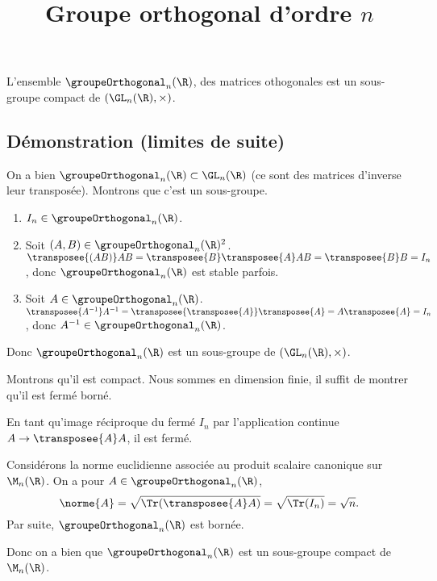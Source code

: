 \documentclass[fontsize=12pt,twoside=false,parskip=half]{scrartcl}
\title{Groupe orthogonal d’ordre $n$}
\date{}
\author{}
\begin{document}
\maketitle
   \begin{Theoreme}
      L’ensemble $\groupeOrthogonal_n(\R)$, des matrices othogonales est un sous-groupe compact de $(\GL_n(\R), \times)$.
   \end{Theoreme}
   \subsection{Démonstration (limites de suite)}
      On a bien $\groupeOrthogonal_n(\R) \subset \GL_n(\R)$ (ce sont des matrices d’inverse leur transposée). Montrons que
      c’est un sous-groupe.
      \begin{enumerate}
         \item $I_n \in \groupeOrthogonal_n(\R)$.
         \item Soit $(A, B) \in \groupeOrthogonal_n(\R)^2$. $\transposee{(AB)}AB = \transposee{B}\transposee{A}AB = \transposee{B}B = I_n$, donc
               $\groupeOrthogonal_n(\R)$ est stable parfois.
         \item Soit $A \in \groupeOrthogonal_n(\R)$. $\transposee{A^{-1}}A^{-1} = \transposee{\transposee{A}}\transposee{A} = A\transposee{A} = I_n$,
               donc $A^{-1} \in \groupeOrthogonal_n(\R)$.         
      \end{enumerate}
      Donc $\groupeOrthogonal_n(\R)$ est un sous-groupe de $(\GL_n(\R), \times)$.
      
      Montrons qu’il est compact. Nous sommes en dimension finie, il suffit de montrer qu’il est fermé borné.
      
      En tant qu’image réciproque du fermé ${I_n}$ par l’application continue $A \to \transposee{A}A$, il est fermé.
      
      Considérons la norme euclidienne associée au produit scalaire canonique sur $\M_n(\R)$. On a pour $A \in \groupeOrthogonal_n(\R)$, 
      \[
         \norme{A} = \sqrt{\Tr(\transposee{A}A)} = \sqrt{\Tr(I_n)} = \sqrt{n}.
      \]
      Par suite, $\groupeOrthogonal_n(\R)$ est bornée.
      
      Donc on a bien que $\groupeOrthogonal_n(\R)$ est un sous-groupe compact de $\M_n(\R)$.
\end{document}
